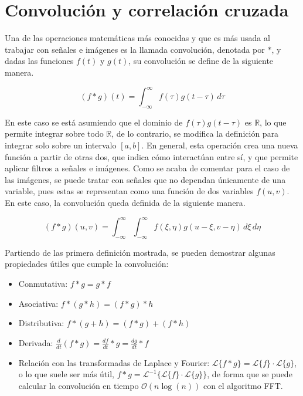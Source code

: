 	\section{Convolución y correlación cruzada}\label{sec:conv_cc}
	
		Una de las operaciones matemáticas más conocidas y que es más usada al trabajar con señales e imágenes es la llamada convolución, denotada por $\ast$, y dadas las funciones $f(t)$ y $g(t)$, su convolución se define de la siguiente manera. 
		
		$$
		(f \ast g)(t) = \int_{-\infty}^\infty f(\tau)g(t - \tau)\,d\tau
		$$
		
		En este caso se está asumiendo que el dominio de $f(\tau)g(t - \tau)$ es $\mathbb{R}$, lo que permite integrar sobre todo $\mathbb{R}$, de lo contrario, se modifica la definición para integrar solo sobre un intervalo $[a, b]$. En general, esta operación crea una nueva función a partir de otras dos, que indica cómo interactúan entre sí, y que permite aplicar filtros a señales e imágenes. Como se acaba de comentar para el caso de las imágenes, se puede tratar con señales que no dependan únicamente de una variable, pues estas se representan como una función de dos variables $f(u, v)$. En este caso, la convolución queda definida de la siguiente manera. 
		
		$$
		(f \ast g)(u, v) = \int_{-\infty}^\infty\int_{-\infty}^\infty f(\xi, \eta)g(u - \xi, v - \eta)\,d\xi\,d\eta
		$$
		
		Partiendo de las primera definición mostrada, se pueden demostrar algunas propiedades útiles que cumple la convolución\cite{lopez2009metodo}: 
		
		\begin{itemize}
			\item Conmutativa: $f \ast g = g \ast f$
			\item Asociativa: $f \ast (g \ast h) = (f \ast g) \ast h$
			\item Distributiva: $f \ast (g + h) = (f \ast g) + (f \ast h)$
			\item Derivada: $\frac{d}{dt}(f \ast g) = \frac{df}{dt}\ast g = \frac{dg}{dt}\ast f$
			\item Relación con las transformadas de Laplace y Fourier: $\mathscr{L}\{f \ast g\} = \mathscr{L}\{f\} \cdot \mathscr{L}\{g\}$, o lo que suele ser más útil, $f \ast g = \mathscr{L}^{-1}\{\mathscr{L}\{f\}\cdot\mathscr{L}\{g\}\}$, de forma que se puede calcular la convolución en tiempo $\mathcal{O}(n\log(n))$ con el algoritmo FFT\cite{fft}. 
		\end{itemize}
		
